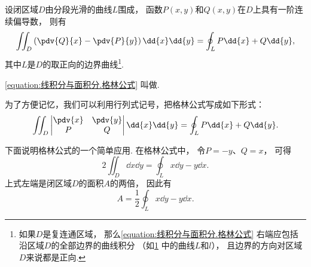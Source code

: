 \begin{figure}[htb]
\centering
{}
\caption{}
\label{figure:线积分与面积分.平面区域的边界曲线与其取向}
\end{figure}

\begin{theorem}[格林公式]
设闭区域\(D\)由分段光滑的曲线\(L\)围成，
函数\(P(x,y)\)和\(Q(x,y)\)在\(D\)上具有一阶连续偏导数，
则有
\begin{equation}\label{equation:线积分与面积分.格林公式}
	\iint_D \left( \pdv{Q}{x} - \pdv{P}{y} \right) \dd{x}\dd{y}
	= \oint_L P\dd{x} + Q\dd{y},
\end{equation}
其中\(L\)是\(D\)的取正向的边界曲线\footnote{%
如果\(D\)是复连通区域，
那么\cref{equation:线积分与面积分.格林公式}
右端应包括沿区域\(D\)的全部边界的曲线积分
（如\cref{figure:线积分与面积分.平面区域的边界曲线与其取向} 中的曲线\(L\)和\(l\)），
且边界的方向对区域\(D\)来说都是正向.}.
\end{theorem}
\cref{equation:线积分与面积分.格林公式} 叫做.

为了方便记忆，我们可以利用行列式记号，把格林公式写成如下形式：\begin{equation*}
	\iint_D \begin{vmatrix}
		\pdv{x} & \pdv{y} \\
		P & Q
	\end{vmatrix} \dd{x}\dd{y}
	= \oint_L P\dd{x}+Q\dd{y}.
\end{equation*}

下面说明格林公式的一个简单应用.
在格林公式中，
令\(P=-y\)、\(Q=x\)，
可得\begin{equation*}
	2 \iint_D \dd{x}\dd{y}
	=\oint_L x\dd{y}-y\dd{x}.
\end{equation*}
上式左端是闭区域\(D\)的面积\(A\)的两倍，
因此有
\begin{equation}\label{equation:线积分与面积分.利用格林公式计算闭区域的面积}
	A = \frac{1}{2} \oint_L x\dd{y}-y\dd{x}.
\end{equation}

